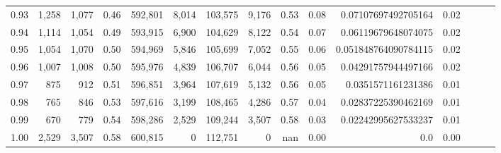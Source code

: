 \begin{tabular}{rrrrrrrrrrrrrrr}
0.93 &   1,258 &  1,077 &  0.46 &  592,801 &    8,014 &  103,575 &    9,176 &  0.53 &  0.08 &   0.07107697492705164 &      0.02 \\
0.94 &   1,114 &  1,054 &  0.49 &  593,915 &    6,900 &  104,629 &    8,122 &  0.54 &  0.07 &   0.06119679648074075 &      0.02 \\
0.95 &   1,054 &  1,070 &  0.50 &  594,969 &    5,846 &  105,699 &    7,052 &  0.55 &  0.06 &  0.051848764090784115 &      0.02 \\
0.96 &   1,007 &  1,008 &  0.50 &  595,976 &    4,839 &  106,707 &    6,044 &  0.56 &  0.05 &   0.04291757944497166 &      0.02 \\
0.97 &     875 &    912 &  0.51 &  596,851 &    3,964 &  107,619 &    5,132 &  0.56 &  0.05 &    0.0351571161231386 &      0.01 \\
0.98 &     765 &    846 &  0.53 &  597,616 &    3,199 &  108,465 &    4,286 &  0.57 &  0.04 &   0.02837225390462169 &      0.01 \\
0.99 &     670 &    779 &  0.54 &  598,286 &    2,529 &  109,244 &    3,507 &  0.58 &  0.03 &   0.02242995627533237 &      0.01 \\
1.00 &   2,529 &  3,507 &  0.58 &  600,815 &        0 &  112,751 &        0 &   nan &  0.00 &                   0.0 &      0.00 \\
\bottomrule
\end{tabular}

